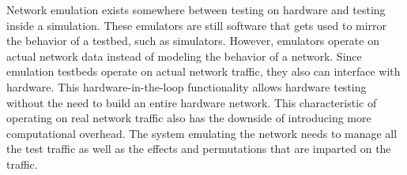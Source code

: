 Network emulation exists somewhere between testing on hardware and testing inside a simulation.
These emulators are still software that gets used to mirror the behavior of a testbed, such as simulators.
However, emulators operate on actual network data instead of modeling the behavior of a network.
Since emulation testbeds operate on actual network traffic, they also can interface with hardware.
This hardware-in-the-loop functionality allows hardware testing without the need to build an entire hardware network.
This characteristic of operating on real network traffic also has the downside of introducing more computational overhead.
The system emulating the network needs to manage all the test traffic as well as the effects and permutations that are imparted on the traffic.\par

